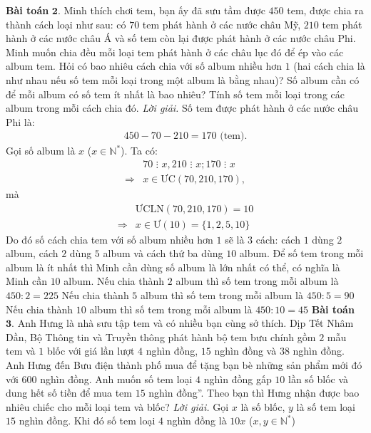\begin{multicols}{2}
	\textbf{\color{toancuabi}Bài toán} $\pmb{2.}$ Minh thích chơi tem, bạn ấy đã sưu tầm được $450$ tem, được chia ra thành cách loại như sau: có $70$ tem phát hành ở các nước châu Mỹ, $210$ tem phát hành ở các nước châu Á và số tem còn lại được phát hành ở các nước châu Phi. Minh muốn chia đều mỗi loại tem phát hành ở các châu lục đó để ép vào các album tem. Hỏi có bao nhiêu cách chia với số album nhiều hơn $1$ (hai cách chia là như nhau nếu số tem mỗi loại trong một album là bằng nhau)? Số album cần có để mỗi album có số tem ít nhất là bao nhiêu? Tính số tem mỗi loại trong các album trong mỗi cách chia đó.
	\vskip 0.1cm
	\textit{Lời giải.}
	Số tem được phát hành ở các nước châu Phi là:
	\begin{align*}
		450 - 70 - 210 =170  \text{ (tem).}
	\end{align*}
	Gọi số album là $x$  ($x \in \mathbb{N^*}$).
	\vskip 0.1cm
	Ta có:
	\begin{align*}
		&70\,\,\vdots\,\, x, 210\,\,\vdots\,\, x; 170 \,\,\vdots\,\, x\\
		\Rightarrow & x \in  \text{ƯC}(70,210,170), 
	\end{align*}
	mà
	\begin{align*}
		&\text{ƯCLN}(70,210,170)=10 \\
		\Rightarrow &x \in \text{Ư}(10)=\{1,2,5,10\}
	\end{align*}
	Do đó số cách chia tem với số album nhiều hơn $1$ sẽ là $3$ cách: cách $1$ dùng $2$ album, cách $2$ dùng $5$ album và cách thứ ba dùng $10$ album.  
	Để số tem trong mỗi album là ít nhất thì Minh cần dùng số album là lớn nhất có thể, có nghĩa là Minh cần $10$ album.
	\vskip 0.1cm
	Nếu chia thành $2$ album thì số tem trong mỗi album là  $450 : 2 = 225$
	\vskip 0.1cm  
	Nếu chia thành $5$ album thì số tem trong mỗi album là $450:5=90$ 
	\vskip 0.1cm
	Nếu chia thành $10$ album thì số tem trong mỗi album là $450:10 = 45$
	\vskip 0.1cm 
	\textbf{\color{toancuabi}Bài toán} $\pmb{3.}$ Anh Hưng là nhà sưu tập tem và có nhiều bạn cùng sở thích. Dịp Tết Nhâm Dần, Bộ Thông tin và Truyền thông phát hành bộ tem bưu chính gồm $2$ mẫu tem và $1$ blốc với giá lần lượt $4$ nghìn đồng, $15$ nghìn đồng và $38$ nghìn đồng. Anh Hưng đến Bưu điện thành phố mua để tặng bạn bè những sản phẩm mới đó với $600$ nghìn đồng. Anh muốn số tem loại $4$ nghìn đồng gấp $10$ lần số blốc và dung hết số tiền để mua tem $15$ nghìn đồng”. Theo bạn thì Hưng nhận được bao nhiêu chiếc cho mỗi loại tem và blốc? 
	\vskip 0.1cm
	\textit{Lời giải.}
	Gọi $x$ là số blốc, $y$ là số tem loại $15$ nghìn đồng. Khi đó số tem loại $4$ nghìn đồng là $10x$  ($x, y \in \mathbb{N^*}$)

\end{multicols}
